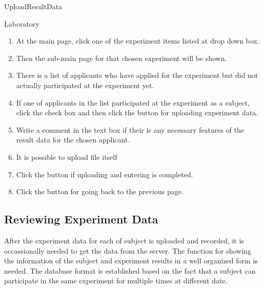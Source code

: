 \documentclass[letterpaper, 10 pt, conference]{ieeeconf}  %
\begin{document}
UploadResultData\\

Laboratory\\

\begin{enumerate}
     \item At the main page, click one of the experiment items listed at drop down box.
    \item Then the sub-main page for that chosen experiment will be shown.
\item There is a list of applicants who have applied for the experiment but did not actually participated at the experiment yet. 
\item If one of applicants in the list participated at the experiment as a subject, click the check box and then click the button for uploading experiment data.
\item Write a comment in the text box if their is any necessary features of the result data for the chosen applicant.
\item It is possible to upload file itself
\item Click the button if uploading and entering is completed.
\item Click the button for going back to the previous page.
    
\end{enumerate}


\subsection{Reviewing Experiment Data}
After the experiment data for each of subject is uploaded and recorded, it is occassionally needed to get the data from the server. The function for showing the information of the subject and experiment results in a well organized form is needed. The database format is established based on the fact that a subject can participate in the same experiment for multiple times at different date.\\
\end{document}
